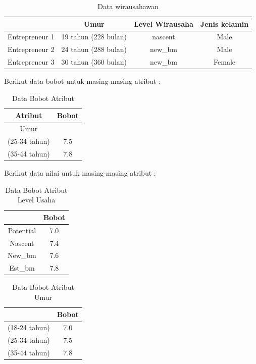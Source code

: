 \begin{table} [H]
\centering
\caption{Data wirausahawan}
\begin{tabular}{|c|c|c|c|}
\hline
& Umur & Level Wirausaha & Jenis kelamin\\
\hline
Entrepreneur 1 & 19 tahun (228 bulan) & nascent & Male\\
\hline
Entrepreneur 2 & 24 tahun (288 bulan) & new\_bm & Male\\
\hline
Entrepreneur 3 & 30 tahun (360 bulan) & new\_bm & Female\\
\hline
\end{tabular}
\end{table}

Berikut data bobot untuk masing-masing atribut :

\begin{table} [H]
\centering
\caption{Data Bobot Atribut}
\begin{tabular}{|c|c|}
\hline
Atribut & Bobot\\
\hline
Umur & \\
\hline
(25-34 tahun) & 7.5\\
\hline
(35-44 tahun) & 7.8\\
\hline
\end{tabular}
\end{table}


Berikut data nilai untuk masing-masing atribut :

\begin{table} [H]
\centering
\caption{Data Bobot Atribut Level Usaha}
\begin{tabular}{|c|c|}
\hline
& Bobot\\
\hline
Potential & 7.0\\
\hline
Nascent & 7.4\\
\hline
New\_bm & 7.6\\
\hline
Est\_bm & 7.8\\
\hline
\end{tabular}
\end{table}

\begin{table} [H]
\centering
\caption{Data Bobot Atribut Umur}
\begin{tabular}{|c|c|}
\hline
& Bobot\\
\hline
(18-24 tahun) & 7.0\\
\hline
(25-34 tahun) & 7.5\\
\hline
(35-44 tahun) & 7.8\\
\hline
\end{tabular}
\end{table}


